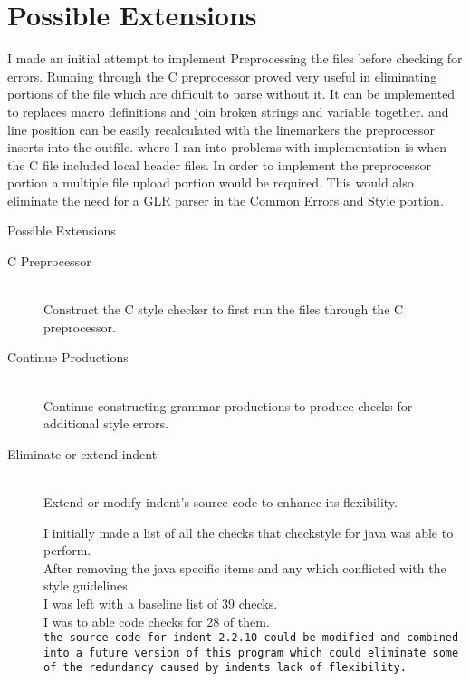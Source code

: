 \documentclass[compress]{beamer}
\begin{document}
\section{Possible Extensions}
    \note
    {
        I made an initial attempt to implement Preprocessing the files before checking for errors. 
        Running through the C preprocessor proved very useful in eliminating portions of the file which are difficult to parse without it.
        It can be implemented to replaces macro definitions and join broken strings and variable together.
        and line position can be easily recalculated with the linemarkers the preprocessor inserts into the outfile.
        where I ran into problems with implementation is when the C file included local header files. 
        In order to implement the preprocessor portion a multiple file upload portion would be required.
        This would also eliminate the need for a GLR parser in the Common Errors and Style portion.
    }
\begin{frame}{Possible Extensions}
\begin{description}
    \item[C Preprocessor] \hfill \\
        Construct the C style checker to first run the files through the C preprocessor.

    \item[Continue Productions] \hfill \\
        Continue constructing grammar productions to produce checks for additional style errors.

    \item[Eliminate or extend indent] \hfill \\
        Extend or modify indent's source code to enhance its flexibility.
    \note
    {
        I initially made a list of all the checks that checkstyle for java was able to perform.\\
        After removing the java specific items and any which conflicted with the style guidelines \\
        I was left with a baseline list of 39 checks. \\
        I was to able code checks for 28 of them.\\
        
        \texttt{the source code for indent 2.2.10 could be modified and combined into a future version of this 
        program which could eliminate some of the redundancy caused by indents lack of flexibility.} 
    
    }
\end{description}

    
\end{frame}
\end{document}

